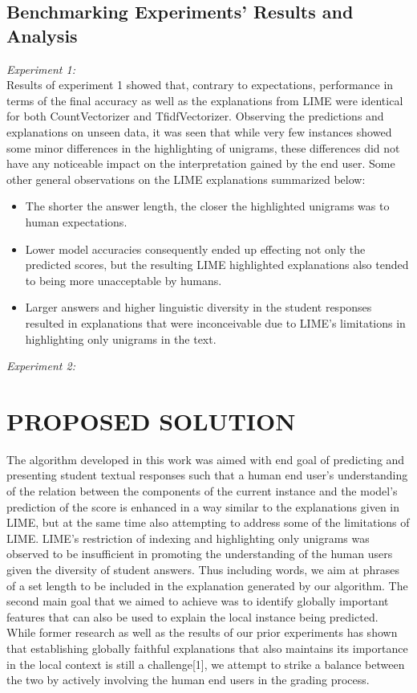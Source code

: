 \documentclass[letterpaper, 10 pt, conference]{ieeeconf}  %
\begin{document}
\subsection{Benchmarking Experiments' Results and Analysis}
\textit{Experiment 1:}\\
Results of experiment 1 showed that, contrary to expectations, performance in terms of the final accuracy as well as the explanations from LIME were identical for both CountVectorizer and TfidfVectorizer. Observing the predictions and explanations on unseen data, it was seen that while very few instances showed some minor differences in the highlighting of unigrams, these differences did not have any noticeable impact on the interpretation gained by the end user. Some other general observations on the LIME explanations summarized below:
\begin{itemize}
\item The shorter the answer length, the closer the highlighted unigrams was to human expectations. 
\item Lower model accuracies consequently ended up effecting not only the predicted scores, but the resulting LIME highlighted explanations also tended to being more unacceptable by humans.
\item Larger answers and higher linguistic diversity in the student responses resulted in explanations that were inconceivable due to LIME's limitations in highlighting only unigrams in the text.
\end{itemize}
\textit{Experiment 2:}\\
\section{PROPOSED SOLUTION}

The algorithm developed in this work was aimed with end goal of predicting and presenting student textual responses such that a human end user's understanding of the relation between the components of the current instance and the model's prediction of the score is enhanced in a way similar to the explanations given in LIME, but at the same time also attempting to address some of the limitations of LIME. LIME's restriction of indexing and highlighting only unigrams was observed to be insufficient in promoting the understanding of the human users given the diversity of student answers. Thus including words, we aim at phrases of a set length to be included  in the explanation generated by our algorithm. The second main goal that we aimed to achieve was to identify globally important features that can also be used to explain the local instance being predicted. While former research as well as the results of our prior experiments has shown that establishing globally faithful explanations that also maintains its importance in the local context is still a challenge[1], we attempt to strike a balance between the two by actively involving the human end users in the grading process.
\end{document}
